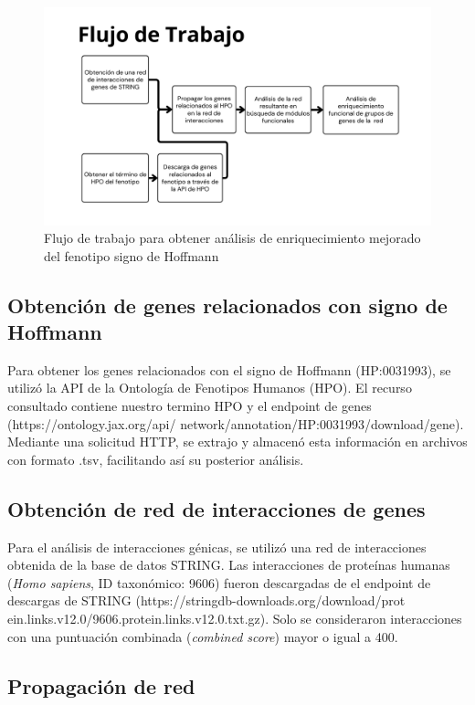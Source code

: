 \begin{figure}[h!]
	\includegraphics[width=.95\textwidth]{figures/workflow.png}
	\caption{Flujo de trabajo para obtener análisis de enriquecimiento mejorado del fenotipo signo de Hoffmann}
	\label{fig:workflow}
\end{figure}

\subsection{Obtención de genes relacionados con signo de Hoffmann}

Para obtener los genes relacionados con el signo de Hoffmann (HP:0031993), se utilizó la API de la Ontología de Fenotipos Humanos (HPO). El recurso consultado contiene nuestro termino HPO y el endpoint de genes (https://ontology.jax.org/api/
network/annotation/HP:0031993/download/gene). Mediante una solicitud HTTP, se extrajo y almacenó esta información en archivos con formato .tsv, facilitando así su posterior análisis. 


\subsection{Obtención de red de interacciones de genes}

Para el análisis de interacciones génicas, se utilizó una red de interacciones obtenida de la base de datos STRING. Las interacciones de proteínas humanas (\textit{Homo sapiens}, ID taxonómico: 9606) fueron descargadas de el endpoint de descargas de STRING (https://stringdb-downloads.org/download/prot ein.links.v12.0/9606.protein.links.v12.0.txt.gz). Solo se consideraron interacciones con una puntuación combinada (\textit{combined score}) mayor o igual a 400.

\subsection{Propagación de red}



